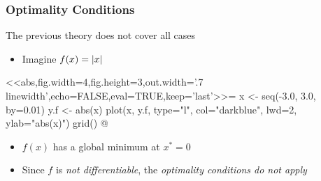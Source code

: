 \documentclass[%
  final,
  11pt, 
  show notes, %
  t, %
  fleqn, %
]{beamer}
\begin{document}
\begin{frame}
  \frametitle{Optimality Conditions}
The previous theory does not cover all cases
\begin{itemize}
\item Imagine $f(x) = \left\lvert x \right\rvert$
\end{itemize}
\vspace*{-1cm}
\begin{center}
<<abs,fig.width=4,fig.height=3,out.width='.7\\linewidth',echo=FALSE,eval=TRUE,keep='last'>>=
x <- seq(-3.0, 3.0, by=0.01)
y.f <- abs(x)
plot(x, y.f, type="l", col="darkblue", lwd=2, ylab="abs(x)")
grid()
@
\end{center}
\vspace*{-1cm}
\begin{itemize}
\item $f(x)$ has a global minimum at $x^\ast = 0$
\item Since $f$ is \emph{not differentiable}, the \emph{optimality conditions do not apply}
\end{itemize}
\end{frame}
\end{document}
